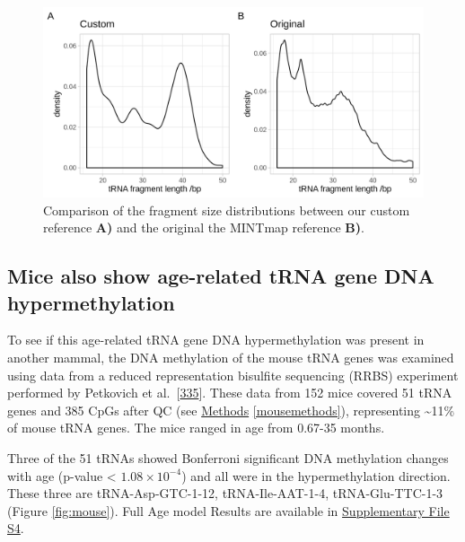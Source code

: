 \documentclass[
]{book}
\begin{document}
\begin{figure}

{\centering \includegraphics[width=1\linewidth]{./figs/combinedFragSizeDists} 

}

\caption{Comparison of the fragment size distributions between our custom reference \textbf{A)} and the original the MINTmap reference \textbf{B)}.}\label{fig:combinedFragSizeDists}
\end{figure}



\hypertarget{mice-also-show-age-related-trna-gene-dna-hypermethylation}{%
\subsection{Mice also show age-related tRNA gene DNA hypermethylation}\label{mice-also-show-age-related-trna-gene-dna-hypermethylation}}

To see if this age-related tRNA gene DNA hypermethylation was present in another mammal, the DNA methylation of the mouse tRNA genes was examined using data from a reduced representation bisulfite sequencing (RRBS) experiment performed by Petkovich et al.~{[}\protect\hyperlink{ref-Petkovich2017}{335}{]}.
These data from 152 mice covered 51 tRNA genes and 385 CpGs after QC (see \protect\hyperlink{mousemethods}{Methods} \ref{mousemethods}), representing \textasciitilde11\% of mouse tRNA genes.
The mice ranged in age from 0.67-35 months.

Three of the 51 tRNAs showed Bonferroni significant DNA methylation changes with age (p-value \textless{} \(1.08 \times 10^{-4}\)) and all were in the hypermethylation direction.
These three are tRNA-Asp-GTC-1-12, tRNA-Ile-AAT-1-4, tRNA-Glu-TTC-1-3 (Figure \ref{fig:mouse}). Full Age model Results are available in \href{Supplementary_Files/SF4_mouse_tRNA_age_models.xlsx}{Supplementary File S4}.
\end{document}
